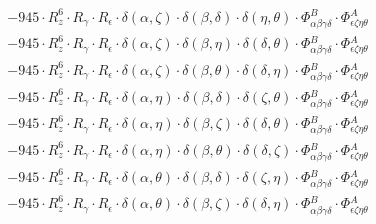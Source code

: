 \documentclass{article}
\begin{document}
\begin{equation}
\begin{array}{c}
 \\[0.2em] 		 - 945 \cdot R_{z}^{6} \cdot R_{\gamma{}} \cdot R_{\epsilon{}} \cdot \delta{}\left(\alpha{}, \zeta{}\right) \cdot \delta{}\left(\beta{}, \delta{}\right) \cdot \delta{}\left(\eta{}, \theta{}\right) \cdot \Phi{}^{B}_{\alpha{}\beta{}\gamma{}\delta{}} \cdot \Phi{}^{A}_{\epsilon{}\zeta{}\eta{}\theta{}} 
 \\[0.2em] 		 - 945 \cdot R_{z}^{6} \cdot R_{\gamma{}} \cdot R_{\epsilon{}} \cdot \delta{}\left(\alpha{}, \zeta{}\right) \cdot \delta{}\left(\beta{}, \eta{}\right) \cdot \delta{}\left(\delta{}, \theta{}\right) \cdot \Phi{}^{B}_{\alpha{}\beta{}\gamma{}\delta{}} \cdot \Phi{}^{A}_{\epsilon{}\zeta{}\eta{}\theta{}} 
 \\[0.2em] 		 - 945 \cdot R_{z}^{6} \cdot R_{\gamma{}} \cdot R_{\epsilon{}} \cdot \delta{}\left(\alpha{}, \zeta{}\right) \cdot \delta{}\left(\beta{}, \theta{}\right) \cdot \delta{}\left(\delta{}, \eta{}\right) \cdot \Phi{}^{B}_{\alpha{}\beta{}\gamma{}\delta{}} \cdot \Phi{}^{A}_{\epsilon{}\zeta{}\eta{}\theta{}} 
 \\[0.2em] 		 - 945 \cdot R_{z}^{6} \cdot R_{\gamma{}} \cdot R_{\epsilon{}} \cdot \delta{}\left(\alpha{}, \eta{}\right) \cdot \delta{}\left(\beta{}, \delta{}\right) \cdot \delta{}\left(\zeta{}, \theta{}\right) \cdot \Phi{}^{B}_{\alpha{}\beta{}\gamma{}\delta{}} \cdot \Phi{}^{A}_{\epsilon{}\zeta{}\eta{}\theta{}} 
 \\[0.2em] 		 - 945 \cdot R_{z}^{6} \cdot R_{\gamma{}} \cdot R_{\epsilon{}} \cdot \delta{}\left(\alpha{}, \eta{}\right) \cdot \delta{}\left(\beta{}, \zeta{}\right) \cdot \delta{}\left(\delta{}, \theta{}\right) \cdot \Phi{}^{B}_{\alpha{}\beta{}\gamma{}\delta{}} \cdot \Phi{}^{A}_{\epsilon{}\zeta{}\eta{}\theta{}} 
 \\[0.2em] 		 - 945 \cdot R_{z}^{6} \cdot R_{\gamma{}} \cdot R_{\epsilon{}} \cdot \delta{}\left(\alpha{}, \eta{}\right) \cdot \delta{}\left(\beta{}, \theta{}\right) \cdot \delta{}\left(\delta{}, \zeta{}\right) \cdot \Phi{}^{B}_{\alpha{}\beta{}\gamma{}\delta{}} \cdot \Phi{}^{A}_{\epsilon{}\zeta{}\eta{}\theta{}} 
 \\[0.2em] 		 - 945 \cdot R_{z}^{6} \cdot R_{\gamma{}} \cdot R_{\epsilon{}} \cdot \delta{}\left(\alpha{}, \theta{}\right) \cdot \delta{}\left(\beta{}, \delta{}\right) \cdot \delta{}\left(\zeta{}, \eta{}\right) \cdot \Phi{}^{B}_{\alpha{}\beta{}\gamma{}\delta{}} \cdot \Phi{}^{A}_{\epsilon{}\zeta{}\eta{}\theta{}} 
 \\[0.2em] 		 - 945 \cdot R_{z}^{6} \cdot R_{\gamma{}} \cdot R_{\epsilon{}} \cdot \delta{}\left(\alpha{}, \theta{}\right) \cdot \delta{}\left(\beta{}, \zeta{}\right) \cdot \delta{}\left(\delta{}, \eta{}\right) \cdot \Phi{}^{B}_{\alpha{}\beta{}\gamma{}\delta{}} \cdot \Phi{}^{A}_{\epsilon{}\zeta{}\eta{}\theta{}} 

\end{array}
\end{equation}
\end{document}
